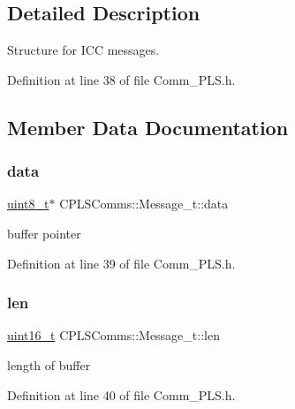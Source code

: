 \subsection{Detailed Description}
Structure for I\+CC messages. 

Definition at line 38 of file Comm\+\_\+\+P\+L\+S.\+h.



\subsection{Member Data Documentation}
\mbox{\label{struct_c_p_l_s_comms_1_1_message__t_a75d42db0cfdf64c0fe1ed1e8b0c472ed}} 
\subsubsection{\texorpdfstring{data}{data}}
{\footnotesize\ttfamily \mbox{\hyperlink{_a_d_a_s___types_8h_aba7bc1797add20fe3efdf37ced1182c5}{uint8\+\_\+t}}$\ast$ C\+P\+L\+S\+Comms\+::\+Message\+\_\+t\+::data}

buffer pointer 

Definition at line 39 of file Comm\+\_\+\+P\+L\+S.\+h.

\mbox{\label{struct_c_p_l_s_comms_1_1_message__t_a3af5b7fed96b157285ec6c8168b64276}} 
\subsubsection{\texorpdfstring{len}{len}}
{\footnotesize\ttfamily \mbox{\hyperlink{_a_d_a_s___types_8h_a1f1825b69244eb3ad2c7165ddc99c956}{uint16\+\_\+t}} C\+P\+L\+S\+Comms\+::\+Message\+\_\+t\+::len}

length of buffer 

Definition at line 40 of file Comm\+\_\+\+P\+L\+S.\+h.

\mbox{\label{struct_c_p_l_s_comms_1_1_message__t_a451cdd914ba11c33528a4761ad38faee}} 
